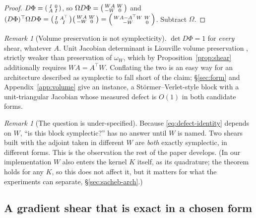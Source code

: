 \documentclass[11pt]{article}
\theoremstyle{definition}
\theoremstyle{remark}
\newtheorem{remark}[theorem]{Remark}
\begin{document}
\begin{proof}
$D\Phi=\begin{psmallmatrix} I&0\\ A&I\end{psmallmatrix}$, so
$\Omega D\Phi=\begin{psmallmatrix} WA& W\\ -W&0\end{psmallmatrix}$ and
$(D\Phi)^{\top}\Omega D\Phi
=\begin{psmallmatrix} I&A^{\top}\\ 0&I\end{psmallmatrix}
 \begin{psmallmatrix} WA& W\\ -W&0\end{psmallmatrix}
=\begin{psmallmatrix} WA-A^{\top}W& W\\ -W&0\end{psmallmatrix}$.
Subtract $\Omega$.
\end{proof}

\begin{remark}[Volume preservation is not symplecticity]
\label{rem:volume}
$\det D\Phi=1$ for \emph{every} shear, whatever $A$. Unit Jacobian determinant is
Liouville volume preservation \citep{arnold1989mechanics}, strictly weaker than
preservation of $\omega_W$,
which by Proposition~\ref{prop:shear} additionally requires $WA=A^{\top}W$.
Conflating the two is an easy way for an architecture described as symplectic to
fall short of the claim; \S\ref{sec:form} and Appendix~\ref{app:volume} give an
instance, a St\"ormer--Verlet-style block with a unit-triangular Jacobian whose
measured defect is $O(1)$ in both candidate forms.
\end{remark}

\begin{remark}[The question is under-specified]
\label{rem:illposed}
Because \eqref{eq:defect-identity} depends on $W$, ``is this block symplectic?''
has no answer until $W$ is named. Two shears built with the adjoint taken in
different $W$ are \emph{both} exactly symplectic, in different forms. This is
the observation the rest of the paper develops. (In our implementation $W$
also enters the kernel $K$ itself, as its quadrature; the theorem holds for any
$K$, so this does not affect it, but it matters for what the experiments can
separate, \S\ref{sec:sacheb-arch}.)
\end{remark}

\subsection{A gradient shear that is exact in a chosen form}
\label{sec:sacheb}
\end{document}
